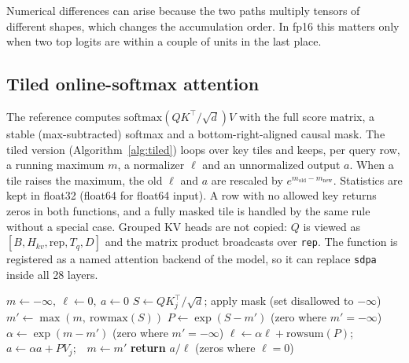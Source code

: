 \documentclass[conference]{IEEEtran}
\begin{document}
Numerical differences can arise because the two paths multiply tensors of different shapes, which changes the accumulation order. In fp16 this matters only when two top logits are within a couple of units in the last place.

\subsection{Tiled online-softmax attention}
The reference computes $\mathrm{softmax}(QK^\top/\sqrt{d})V$ with the full score matrix, a stable (max-subtracted) softmax and a bottom-right-aligned causal mask. The tiled version (Algorithm~\ref{alg:tiled}) loops over key tiles and keeps, per query row, a running maximum $m$, a normalizer $\ell$ and an unnormalized output $a$. When a tile raises the maximum, the old $\ell$ and $a$ are rescaled by $e^{m_\text{old}-m_\text{new}}$. Statistics are kept in float32 (float64 for float64 input). A row with no allowed key returns zeros in both functions, and a fully masked tile is handled by the same rule without a special case. Grouped KV heads are not copied: $Q$ is viewed as $[B,H_{kv},\text{rep},T_q,D]$ and the matrix product broadcasts over \texttt{rep}. The function is registered as a named attention backend of the model, so it can replace \texttt{sdpa} inside all 28 layers.

\begin{algorithm}[t]
\caption{Tiled attention with online softmax (one head)}
\label{alg:tiled}
\begin{algorithmic}[1]
\STATE $m\gets-\infty,\ \ell\gets0,\ a\gets0$ 
  \STATE $S\gets QK_j^\top/\sqrt{d}$; apply mask (set disallowed to $-\infty$)
  \STATE $m'\gets\max(m,\ \mathrm{rowmax}(S))$
  \STATE $P\gets\exp(S-m')$ (zero where $m'=-\infty$)
  \STATE $\alpha\gets\exp(m-m')$ (zero where $m'=-\infty$)
  \STATE $\ell\gets\alpha\ell+\mathrm{rowsum}(P)$;\ \ $a\gets\alpha a+PV_j$;\ \ $m\gets m'$
\ENDFOR
\STATE \textbf{return} $a/\ell$ (zeros where $\ell=0$)
\end{algorithmic}
\end{algorithm}
\end{document}
